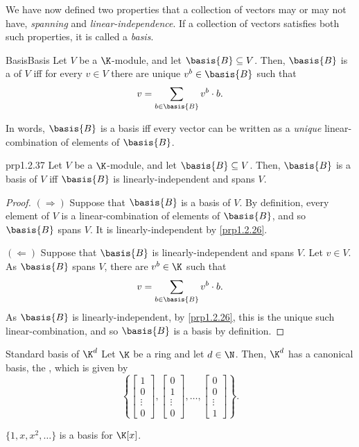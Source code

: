 We have now defined two properties that a collection of vectors may or may not have, \emph{spanning} and \emph{linear-independence}.  If a collection of vectors satisfies both such properties, it is called a \emph{basis}.
\begin{dfn}{Basis}{Basis}
	Let $V$ be a $\K$-module, and let $\basis{B}\subseteq V$.  Then, $\basis{B}$ is a  of $V$ iff for every $v\in V$ there are unique $v^b\in \basis{B}$ such that
	\begin{equation}
		v=\sum _{b\in \basis{B}}v^b\cdot b.
	\end{equation}
	\begin{rmk}
		In words, $\basis{B}$ is a basis iff every vector can be written as a \emph{unique} linear-combination of elements of $\basis{B}$.
	\end{rmk}
\end{dfn}
\begin{prp}{}{prp1.2.37}
	Let $V$ be a $\K$-module, and let $\basis{B}\subseteq V$.  Then, $\basis{B}$ is a basis of $V$ iff $\basis{B}$ is linearly-independent and spans $V$.
	\begin{proof}
		$(\Rightarrow )$ Suppose that $\basis{B}$ is a basis of $V$.  By definition, every element of $V$ is a linear-combination of elements of $\basis{B}$, and so $\basis{B}$ spans $V$.  It is linearly-independent by \cref{prp1.2.26}.
		
		\blni
		$(\Leftarrow )$ Suppose that $\basis{B}$ is linearly-independent and spans $V$.  Let $v\in V$.  As $\basis{B}$ spans $V$, there are $v^b\in \K$ such that
		\begin{equation}
			v=\sum _{b\in \basis{B}}v^b\cdot b.
		\end{equation}
		As $\basis{B}$ is linearly-independent, by \cref{prp1.2.26}, this is the unique such linear-combination, and so $\basis{B}$ is a basis by definition.
	\end{proof}
\end{prp}
\begin{exm}{Standard basis of $\K ^d$}{}
	Let $\K$ be a ring and let $d\in \N$.  Then, $\K ^d$ has a canonical basis, the , which is given by
	\begin{equation}
		\left\{ \begin{bmatrix}1 \\ 0 \\ \vdots \\ 0\end{bmatrix},\begin{bmatrix}0 \\ 1 \\ \vdots \\ 0\end{bmatrix},\ldots ,\begin{bmatrix}0 \\ 0 \\ \vdots \\ 1\end{bmatrix}\right\} .
	\end{equation}
\end{exm}
\begin{exm}{}{}
	$\{ 1,x,x^2,\ldots \}$ is a basis for $\K [x]$.
\end{exm}

